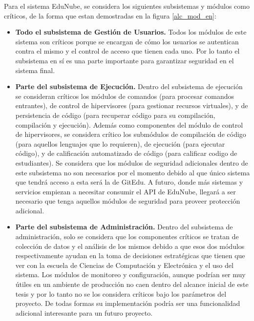 Para el sistema EduNube, se considera los siguientes subsistemas y módulos como críticos, de la forma que estan demostradas en la figura \ref{alc_mod_en}:
\begin{itemize}
	\item \textbf{Todo el subsistema de Gestión de Usuarios.} Todos los módulos de este sistema son críticos porque se encargan de cómo los usuarios se autentican contra el mismo y el control de acceso que tienen cada uno. Por lo tanto el subsistema en sí es una parte importante para garantizar seguridad en el sistema final.
	\item \textbf{Parte del subsistema de Ejecución.} Dentro del subsistema de ejecución se consideran críticos los módulos de comandos (para procesar comandos entrantes), de control de hipervisores (para gestionar recursos virtuales), y de persistencia de código (para recuperar código para su compilación, compilación y ejecución).  Además como componentes del módulo de control de hipervisores, se considera crítico los submódulos de compilación de código (para aquellos lenguajes que lo requieren), de ejecución (para ejecutar código), y de calificación automatizado de código (para calificar codigo de estudiantes). Se considera que los módulos de seguridad adicionales dentro de este subsistema no son necesarios por el momento debido al que único sistema que tendrá acceso a esta será la de GitEdu. A futuro, donde más sistemas y servicios empiezan a necesitar consumir el API de EduNube, llegará a ser necesario que tenga aquellos módulos de seguridad para proveer protección adicional.
	\item \textbf{Parte del subsistema de Administración.} Dentro del subsistema de administración, solo se considera que los componentes críticos se tratan de colección de datos y el análisis de los mismos debido a que esos dos módulos respectivamente ayudan en la toma de decisiones estratégicas que tienen que ver con la escuela de Ciencias de Computación y Electrónica y el uso del sistema. Los módulos de monitoreo y configuración, aunque podrían ser muy útiles en un ambiente de producción no caen dentro del alcance inicial de este tesis y por lo tanto no se los considera críticos bajo los parámetros del proyecto. De todas formas su implementación podría ser una funcionalidad adicional interesante para un futuro proyecto.
\end{itemize}

